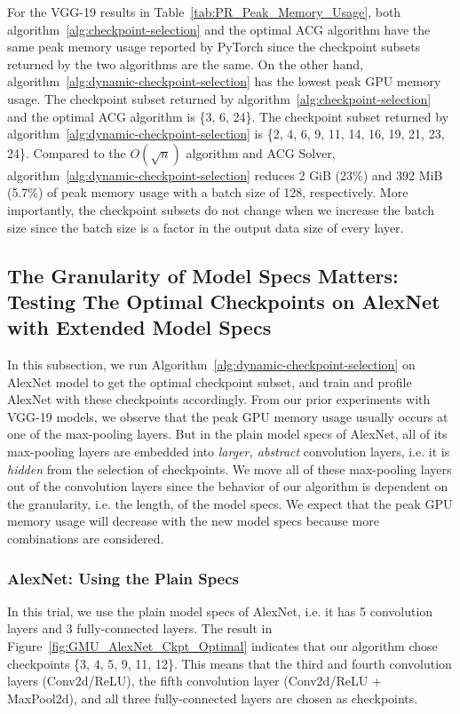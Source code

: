 For the VGG-19 results in Table~\ref{tab:PR_Peak_Memory_Usage}, both algorithm~\ref{alg:checkpoint-selection} and the optimal ACG algorithm have the same peak memory usage reported by PyTorch since the checkpoint subsets returned by the two algorithms are the same. On the other hand, algorithm~\ref{alg:dynamic-checkpoint-selection} has the lowest peak GPU memory usage. The checkpoint subset returned by algorithm~\ref{alg:checkpoint-selection} and the optimal ACG algorithm is \{3, 6, 24\}. The checkpoint subset returned by algorithm~\ref{alg:dynamic-checkpoint-selection} is \{2, 4, 6, 9, 11, 14, 16, 19, 21, 23, 24\}.
Compared to the $O(\sqrt{n})$ algorithm and ACG Solver, algorithm~\ref{alg:dynamic-checkpoint-selection} reduces 2 GiB (23\%) and 392 MiB (5.7\%) of peak memory usage with a batch size of 128, respectively.
More importantly, the checkpoint subsets do not change when we increase the batch size since the batch size is a factor in the output data size of every layer.

\subsection{The Granularity of Model Specs Matters: Testing The Optimal Checkpoints on AlexNet with Extended Model Specs}

In this subsection, we run Algorithm~\ref{alg:dynamic-checkpoint-selection} on AlexNet model to get the optimal checkpoint subset, and train and profile AlexNet with these checkpoints accordingly. From our prior experiments with VGG-19 models, we observe that the peak GPU memory usage usually occurs at one of the max-pooling layers. But in the plain model specs of AlexNet, all of its max-pooling layers are embedded into {\em larger, abstract} convolution layers, i.e. it is {\em hidden} from the selection of checkpoints. We move all of these max-pooling layers out of the convolution layers since the behavior of our algorithm is dependent on the granularity, i.e. the length, of the model specs. We expect that the peak GPU memory usage will decrease with the new model specs because more combinations are considered.

\subsubsection{AlexNet: Using the Plain Specs}

In this trial, we use the plain model specs of AlexNet, i.e. it has 5 convolution layers and 3 fully-connected layers. The result in Figure~\ref{fig:GMU_AlexNet_Ckpt_Optimal} indicates that our algorithm chose checkpoints \{3, 4, 5, 9, 11, 12\}. This means that the third and fourth convolution layers (Conv2d/ReLU), the fifth convolution layer (Conv2d/ReLU + MaxPool2d), and
all three fully-connected layers are chosen as checkpoints.


